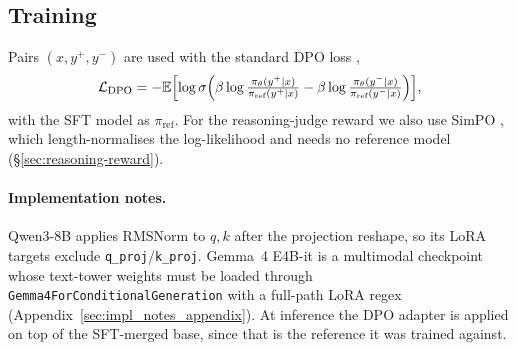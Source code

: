 \subsection{Training}
\label{sec:hybrid_dpo}
Pairs $(x,y^+,y^-)$ are used with the standard DPO loss \citep{rafailov2023direct},
\begin{equation}
\mathcal{L}_\text{DPO} = -\mathbb{E}\Bigl[\log\sigma\Bigl(\beta\log\tfrac{\pi_\theta(y^+|x)}{\pi_\text{ref}(y^+|x)} - \beta\log\tfrac{\pi_\theta(y^-|x)}{\pi_\text{ref}(y^-|x)}\Bigr)\Bigr],
\label{eq:dpo_loss}
\end{equation}
with the SFT model as $\pi_\text{ref}$. For the reasoning-judge reward we also use SimPO \citep{meng2024simpo}, which length-normalises the log-likelihood and needs no reference model (\S\ref{sec:reasoning-reward}).

\paragraph{Implementation notes.} Qwen3-8B applies RMSNorm to $q,k$ after the projection reshape, so its LoRA targets exclude \texttt{q\_proj}/\texttt{k\_proj}. Gemma~4 E4B-it is a multimodal checkpoint whose text-tower weights must be loaded through \texttt{Gemma4ForConditionalGeneration} with a full-path LoRA regex (Appendix~\ref{sec:impl_notes_appendix}). At inference the DPO adapter is applied on top of the SFT-merged base, since that is the reference it was trained against.
